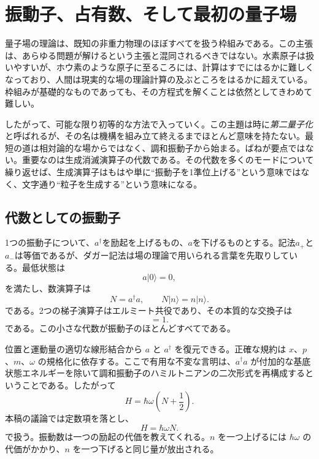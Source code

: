 \chapter{振動子、占有数、そして最初の量子場}

量子場の理論は、既知の非重力物理のほぼすべてを扱う枠組みである。この主張は、あらゆる問題が解けるという主張と混同されるべきではない。水素原子は扱いやすいが、ホウ素のような原子に至るころには、計算はすでにはるかに難しくなっており、人間は現実的な場の理論計算の及ぶところをはるかに超えている。枠組みが基礎的なものであっても、その方程式を解くことは依然としてきわめて難しい。

したがって、可能な限り初等的な方法で入っていく。この主題は時に\emph{第二量子化}と呼ばれるが、その名は機構を組み立て終えるまでほとんど意味を持たない。最短の道は相対論的な場からではなく、調和振動子から始まる。ばねが要点ではない。重要なのは生成消滅演算子の代数である。その代数を多くのモードについて繰り返せば、生成演算子はもはや単に``振動子を1準位上げる''という意味ではなく、文字通り``粒子を生成する''という意味になる。

\section{代数としての振動子}

1つの振動子について、\(a^\dagger\)を励起を上げるもの、\(a\)を下げるものとする。記法\(a_+\)と\(a_-\)は等価であるが、ダガー記法は場の理論で用いられる言葉を先取りしている。最低状態は
\begin{equation}
a|0\rangle=0,
\end{equation}
を満たし、数演算子は
\begin{equation}
N=a^\dagger a,
\qquad
N|n\rangle=n|n\rangle.
\end{equation}
である。2つの梯子演算子はエルミート共役であり、その本質的な交換子は
\begin{equation}
[a,a^\dagger]=1.
\label{eq:l06-single-commutator}
\end{equation}
である。この小さな代数が振動子のほとんどすべてである。

位置と運動量の適切な線形結合から \(a\) と \(a^\dagger\) を復元できる。正確な規約は \(x\)、\(p\)、\(m\)、\(\omega\) の規格化に依存する。ここで有用な不変な言明は、\(a^\dagger a\) が付加的な基底状態エネルギーを除いて調和振動子のハミルトニアンの二次形式を再構成するということである。したがって
\begin{equation}
H=\hbar\omega\left(N+\frac12\right).
\end{equation}
本稿の議論では定数項を落とし、
\begin{equation}
H=\hbar\omega N.
\label{eq:l06-one-oscillator-hamiltonian}
\end{equation}
で扱う。振動数は一つの励起の代価を教えてくれる。\(n\) を一つ上げるには \(\hbar\omega\) の代価がかかり、\(n\) を一つ下げると同じ量が放出される。

